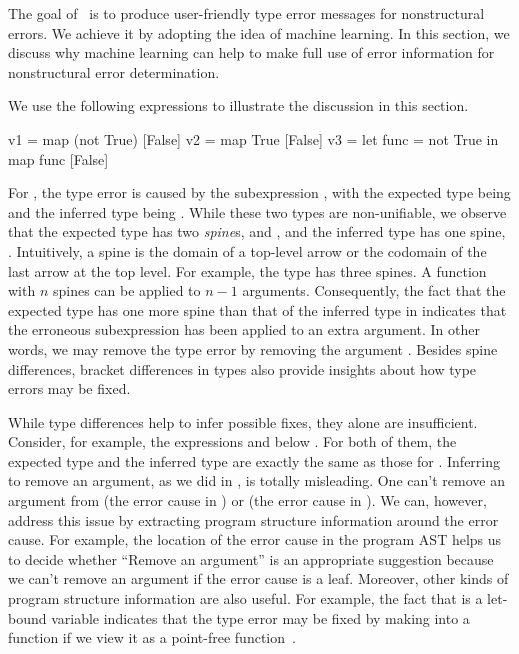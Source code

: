 \documentclass[12pt]{report}	%
\begin{document}
The goal of \newCompiler\ is to produce
user-friendly type error messages for nonstructural errors.
We achieve it by adopting the idea of machine learning.
In this section, we discuss why machine learning
can help to make full use of error information for
nonstructural error determination.

We use the following expressions to illustrate the discussion in
this section.
%
\begin{program}
v1 = map (not True) [False]   
v2 = map True [False]   
v3 = let func = not True 
     in map func [False]
\end{program}
%
For , the type error is caused by the subexpression ,
with the expected type being  and the inferred type being \Bool.
While these two types are non-unifiable, we observe that the expected type
has two \emph{spine}s,  and , and the inferred type has one
spine, \Bool. Intuitively, a spine is the domain of a top-level
arrow or the codomain of the last arrow at the top level. For example,
the type  has three spines. A function with $n$
spines can be applied to $n-1$ arguments. Consequently, the fact that the
expected type has one more spine than that of the inferred type in 
indicates that the 
erroneous subexpression has been applied to 
an extra argument.
In other words, we may remove the type error by removing the
argument . Besides spine differences, bracket differences in
types also provide insights about how type errors may be fixed.

While type differences help to infer possible fixes, they alone
are insufficient. Consider, for example, the expressions 
and  below . For both of them, the
expected type and the inferred type are exactly the same as those
for . Inferring to remove an argument, as we did in ,
is totally misleading. One can't remove an argument from 
(the error cause in ) or  (the error cause
in ). We can, however, address this issue by extracting
program structure information around the error cause.
For example, the location of the error cause in the program
AST helps us to decide whether ``Remove an argument'' is an appropriate
suggestion because we can't remove an argument if the error cause is a leaf.
Moreover, other kinds of program structure information
are also useful. For example, the fact that  is a let-bound
variable indicates that the type error may be fixed by making
 into a function if we view it as a 
point-free function~\cite{jones2003haskell}.
\end{document}
